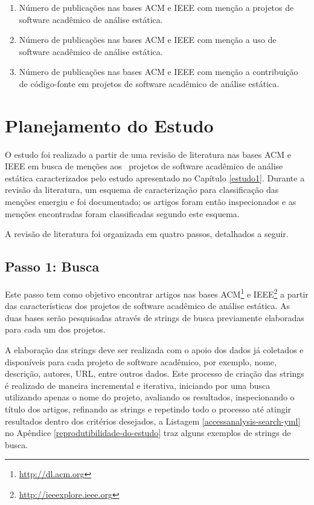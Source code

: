 \begin{enumerate}
  \item Número de publicações nas bases ACM e IEEE com menção a projetos de
    software acadêmico de análise estática.
  \item Número de publicações nas bases ACM e IEEE com menção a uso de
    software acadêmico de análise estática.
  \item Número de publicações nas bases ACM e IEEE com menção a contribuição de
    código-fonte em projetos de software acadêmico de análise estática.
\end{enumerate}


\section{Planejamento do Estudo} \label{estudo2:planejamento} %

O estudo foi realizado a partir de uma revisão de literatura nas bases ACM e
IEEE em busca de menções aos \SoftwareCount \ projetos de software acadêmico de
análise estática caracterizados pelo estudo apresentado no Capítulo \ref{estudo1}. 
Durante a revisão da literatura, 
um esquema de caracterização para classificação das menções emergiu e foi documentado;
os artigos foram então inspecionados e as menções encontradas foram classificadas segundo
este esquema.

A revisão de literatura foi organizada em quatro passos, detalhados a seguir.

\subsection{Passo 1: Busca}

Este passo tem como objetivo encontrar artigos nas bases
ACM\footnote{\url{http://dl.acm.org}} e
IEEE\footnote{\url{http://ieeexplore.ieee.org}} a partir das características
dos projetos de software acadêmico de análise estática.
As duas bases serão pesquisadas através de strings de busca previamente
elaboradas para cada um dos projetos.

A elaboração das strings deve ser realizada com o apoio dos dados já coletados
e disponíveis para cada projeto de software acadêmico, por exemplo, nome,
descrição, autores, URL, entre outros dados. Este processo de criação das
strings é realizado de maneira incremental e iterativa, iniciando por uma busca
utilizando apenas o nome do projeto, avaliando os resultados, inspecionando o
título dos artigos, refinando as strings e repetindo todo o processo até
atingir resultados dentro dos critérios desejados, a Listagem \ref{accessanalysis-search-yml}
no Apêndice \ref{reprodutibilidade-do-estudo} traz alguns exemplos de strings de busca.

